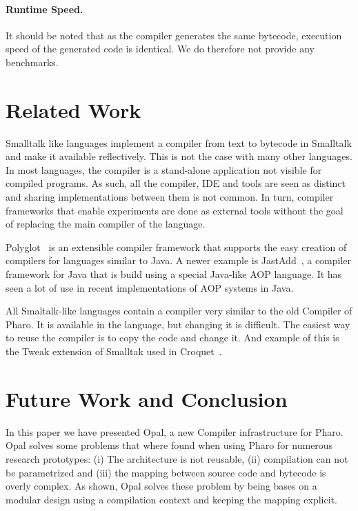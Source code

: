 \documentclass[preprint,10pt]{sigplanconf}
\begin{document}
\paragraph{Runtime Speed.}
It should be noted that as the compiler generates the same bytecode, execution speed of the generated code is identical. We do therefore not provide any benchmarks.


\section{Related Work}
\label{sec:related}
Smalltalk like languages implement a compiler from text to bytecode in Smalltalk and make it available reflectively. This is not the case
with many other languages. In most languages, the compiler is a stand-alone application not visible for compiled programs. As such, all the compiler, IDE
and tools are seen as distinct and sharing implementations between them is not common. In turn, compiler frameworks that enable experiments are done
as external tools without the goal of replacing the main compiler of the language.

Polyglot~\cite{Nyst03a} is an extensible compiler framework that supports the easy creation of compilers for languages similar to Java.
A newer example is JastAdd~\cite{Ekma07b}, a compiler framework for Java that is build using a special Java-like AOP language.
It has seen a lot of use in recent implementations of AOP systems in Java.

All Smaltalk-like languages contain a compiler very similar to the old Compiler of Pharo. It is available in the language, but changing it is difficult. The easiest way to reuse the compiler is to copy the code and change it. And example of this is the Tweak extension of Smalltak used in Croquet~\cite{Smit03}.

\section{Future Work and Conclusion}
\label{sec:conclusion}

In this paper we have presented Opal, a new Compiler infrastructure for Pharo. Opal solves some problems that where found when using Pharo for 
numerous research prototypes: (i) The architecture is not reusable, (ii) compilation can not be parametrized and (iii) the mapping between source code and bytecode is overly complex. As shown, Opal solves these problem by being bases on a modular design using a compilation context and keeping the mapping explicit.
\end{document}
